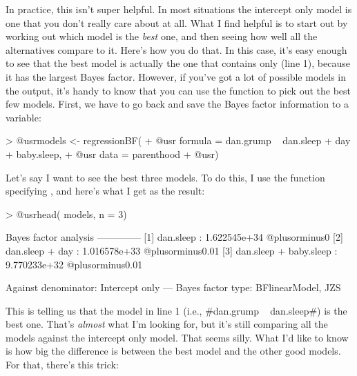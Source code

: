 
In practice, this isn't super helpful. In most situations the intercept only model is one that you don't really care about at all. What I find helpful is to start out by working out which model is the {\it best} one, and then seeing how well all the alternatives compare to it. Here's how you do that. In this case, it's easy enough to see that the best model is actually the one that contains  only (line 1), because it has the largest Bayes factor. However, if you've got a lot of possible models in the output, it's handy to know that you can use the  function to pick out the best few models. First, we have to go back and save the Bayes factor information to a variable:

\begin{rblock1}
> @usr{models <- regressionBF(}
+ @usr{   formula = dan.grump ~ dan.sleep + day + baby.sleep,}
+ @usr{   data = parenthood}
+ @usr{)}
\end{rblock1}

\noindent
Let's say I want to see the best three models. To do this, I use the  function specifying , and here's what I get as the result:
\begin{rblock1}
> @usr{head( models, n = 3)}

Bayes factor analysis
--------------
[1] dan.sleep              : 1.622545e+34 @plusorminus0%
[2] dan.sleep + day        : 1.016578e+33 @plusorminus0.01%
[3] dan.sleep + baby.sleep : 9.770233e+32 @plusorminus0.01%

Against denominator:
  Intercept only 
---
Bayes factor type: BFlinearModel, JZS
\end{rblock1}
This is telling us that the model in line 1 (i.e., \rtextverb#dan.grump ~ dan.sleep#) is the best one. That's {\it almost} what I'm looking for, but it's still comparing all the models against the intercept only model. That seems silly. What I'd like to know is how big the difference is between the best model and the other good models. For that, there's this trick:



